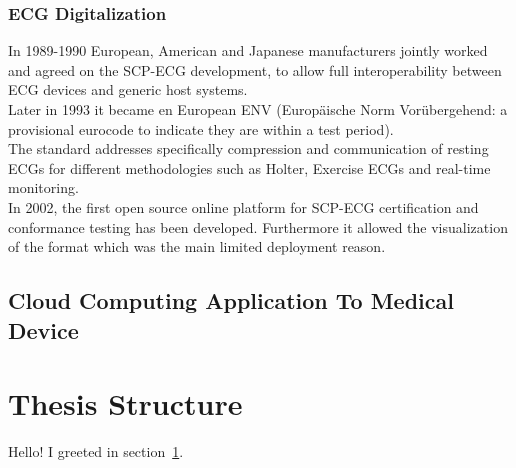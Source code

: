 \subsubsection{ECG Digitalization}
In 1989-1990 European, American and Japanese manufacturers jointly worked and agreed on the SCP-ECG development, to allow full interoperability between ECG devices and generic host systems.\\
Later in 1993 it became en European ENV (Europäische Norm Vorübergehend: a provisional eurocode to indicate they are within a test period).\\
The standard addresses specifically compression and communication of resting ECGs for different methodologies such as Holter, Exercise ECGs and real-time monitoring.\\
In 2002, the first open source online platform for SCP-ECG certification and conformance testing has been developed. Furthermore it allowed the visualization of the format which was the main limited deployment reason.\cite{Chronaki}\\

\subsection{Cloud Computing Application To Medical Device}


\section{Thesis Structure}
\label{sec:greetings}

Hello!
I greeted in section~\ref{sec:greetings}.